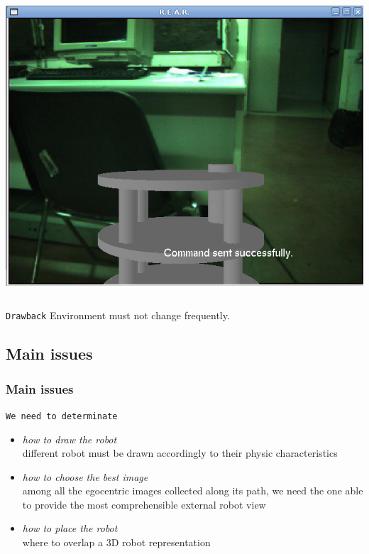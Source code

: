 {\begin{columns}
     {
      \includegraphics[width=\textwidth]{img/virtual_exocentric.png}
    }
    
  \end{columns}
  
  \pause
  
  \begin{block} {\alert{\texttt{Drawback}}}
    Environment must not change frequently.
  \end{block}


}

\subsection{Main issues}
\frame
{
  \frametitle{Main issues}


  
  \begin{block} {\alert{\texttt{We need to determinate}}}
    
    \pause
    
    \begin{itemize}
      
    \item \alert{\textit{how to draw the robot}} \\
      different robot must be drawn accordingly to
      their physic characteristics
      \pause
      
    \item \alert{\textit{how to choose the best image}} \\
      among all the egocentric images collected along
      its path, we need the one able to provide the most
      comprehensible external robot view
      \pause
      
    \item \alert{\textit{how to place the robot}} \\
      where to overlap a 3D robot representation      
    \end{itemize}
    
  \end{block}
}
